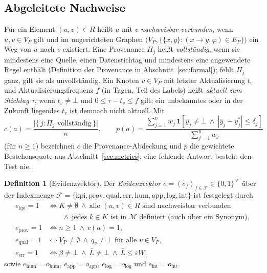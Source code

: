 \documentclass[a4paper,12pt]{article}
\theoremstyle{definition}
\newtheorem{definition}{Definition}[section]
\begin{document}
\subsection{Abgeleitete Nachweise}

Für ein Element $(u,v)\in R$ heißt $u$ mit $v$ \emph{nachweisbar verbunden}, wenn $u,v\in V_P$ gilt und im ungerichteten Graphen $\bigl(V_P,\{\{x,y\}: (x\to y,\varphi)\in E_P\}\bigr)$ ein Weg von $u$ nach $v$ existiert. Eine Provenance $\Pi_j$ heißt \emph{vollständig}, wenn sie mindestens eine Quelle, einen Datenstichtag und mindestens eine angewendete Regel enthält (Definition der Provenance in Abschnitt~\ref{sec:formal}); fehlt $\Pi_j$ ganz, gilt sie als unvollständig. Ein Knoten $v\in V_P$ mit letzter Aktualisierung $t_v$ und Aktualisierungsfrequenz $f$ (in Tagen, Teil des Labels) heißt \emph{aktuell zum Stichtag $\tau$}, wenn $t_v\neq\bot$ und $0\le\tau-t_v\le f$ gilt; ein unbekanntes oder in der Zukunft liegendes $t_v$ ist demnach nicht aktuell. Mit
\[
c(a)=\frac{\bigl|\{\,j:\Pi_j\text{ vollständig}\,\}\bigr|}{n},\qquad
p(a)=\frac{\sum_{j=1}^n w_j\,\mathbf 1\!\left[\hat y_j\neq\bot\ \wedge\ |\hat y_j-y_j^*|\le\delta_j\right]}{\sum_{j=1}^n w_j}
\]
(für $n\ge 1$) bezeichnen $c$ die Provenance-Abdeckung und $p$ die gewichtete Bestehensquote aus Abschnitt~\ref{sec:metrics}; eine fehlende Antwort besteht den Test nie.

\begin{definition}[Evidenzvektor]\label{def:evidence}
Der \emph{Evidenzvektor} $e=(e_f)_{f\in\mathcal F}\in\{0,1\}^{\mathcal F}$ über der Indexmenge $\mathcal F=\{\mathrm{kpi},\mathrm{prov},\mathrm{qual},\mathrm{err},\mathrm{hum},\mathrm{app},\mathrm{log},\mathrm{int}\}$ ist festgelegt durch
\begin{align*}
e_{\mathrm{kpi}}=1&\iff K\neq\emptyset\ \wedge\ \text{alle }(u,v)\in R\text{ sind nachweisbar verbunden}\\
&\qquad\wedge\ \text{jedes }k\in K\text{ ist in }\mathcal M\text{ definiert (auch über ein Synonym)},\\
e_{\mathrm{prov}}=1&\iff n\ge 1\ \wedge\ c(a)=1,\\
e_{\mathrm{qual}}=1&\iff V_P\neq\emptyset\ \wedge\ q_v\neq\bot\text{ für alle }v\in V_P,\\
e_{\mathrm{err}}=1&\iff \beta\neq\bot\ \wedge\ \bar L\neq\bot\ \wedge\ \bar L\le\varepsilon W,
\end{align*}
sowie $e_{\mathrm{hum}}=o_{\mathrm{hum}}$, $e_{\mathrm{app}}=o_{\mathrm{app}}$, $e_{\mathrm{log}}=o_{\mathrm{log}}$ und $e_{\mathrm{int}}=o_{\mathrm{int}}$.
\end{definition}
\end{document}
